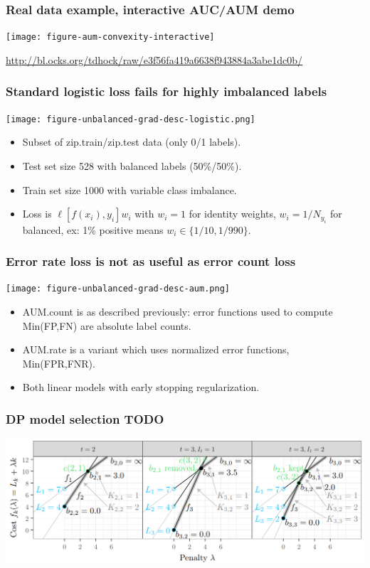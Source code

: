 \documentclass[t]{beamer}
\begin{document}
\begin{frame}
  \frametitle{Real data example, interactive AUC/AUM demo}

  \texttt{[image: figure-aum-convexity-interactive]}

  \url{http://bl.ocks.org/tdhock/raw/e3f56fa419a6638f943884a3abe1dc0b/} 

\end{frame}

\begin{frame}
  \frametitle{Standard logistic loss fails for highly imbalanced labels}

 \texttt{[image: figure-unbalanced-grad-desc-logistic.png]}

 \begin{itemize}
 \item Subset of zip.train/zip.test data (only 0/1 labels).
 \item Test set size 528 with balanced labels (50\%/50\%).
 \item Train set size 1000 with variable class imbalance.
 \item Loss is $\ell[f(x_i), y_i]w_i$ with $w_i=1$ for identity
   weights, $w_i=1/N_{y_i}$ for balanced, ex: 1\% positive means
   $w_i\in\{1/10,1/990\}$.
 \end{itemize}

\end{frame}

\begin{frame}
  \frametitle{Error rate loss is not as useful as error count loss}

 \texttt{[image: figure-unbalanced-grad-desc-aum.png]}

 \begin{itemize}
 \item AUM.count is as described previously: error functions used to
   compute Min(FP,FN) are absolute label counts.
 \item AUM.rate is a variant which uses normalized error functions,
   Min(FPR,FNR).
 \item Both linear models with early stopping regularization.
 \end{itemize}

\end{frame}

\begin{frame}
  \frametitle{DP model selection TODO}
  \includegraphics[width=\textwidth]{figure-dp-model-selection-example}
\end{frame}
\end{document}
